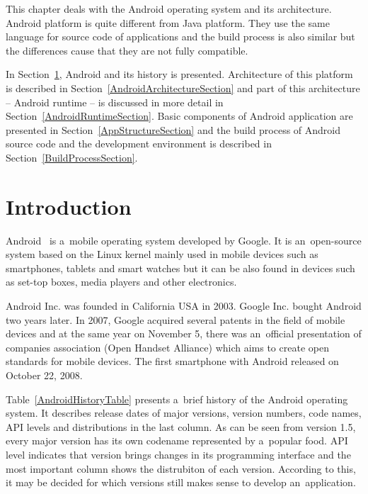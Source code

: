 This chapter deals with the Android operating system and its architecture. Android platform is quite different from
Java platform. They use the same language for source code of applications and the build process is also similar but the
differences cause that they are not fully compatible.

In Section~\ref{AndroidIntroductionSection}, Android and its history is presented. Architecture of this platform is
described in Section~\ref{AndroidArchitectureSection} and part of this architecture -- Android runtime -- is discussed
in more detail in Section~\ref{AndroidRuntimeSection}. Basic components of Android application are presented in
Section~\ref{AppStructureSection} and the build process of Android source code and the development environment is
described in Section~\ref{BuildProcessSection}.

\section{Introduction}\label{AndroidIntroductionSection}
Android~\cite{AndroidBook, AndroidProgBook} is a~mobile operating system developed by Google. It is an~open-source
system based on the Linux kernel mainly used in mobile devices such as smartphones, tablets and smart watches but it can
be also found in devices such as set-top boxes, media players and other electronics.

Android Inc. was founded in California USA in 2003. Google Inc. bought Android two years later. In 2007, Google acquired
several patents in the field of mobile devices and at the same year on November 5, there was an~official presentation
of companies association (Open Handset Alliance) which aims to create open standards for mobile devices. The first
smartphone with Android released on October 22, 2008.

Table~\ref{AndroidHistoryTable} presents a~brief history of the Android operating system. It describes release dates of
major versions, version numbers, code names, API levels and distributions in the last column. As can be seen from
version 1.5, every major version has its own codename represented by a~popular food. API level indicates that version
brings changes in its programming interface and the most important column shows the distrubiton of each version.
According to this, it may be decided for which versions still makes sense to develop an~application.

